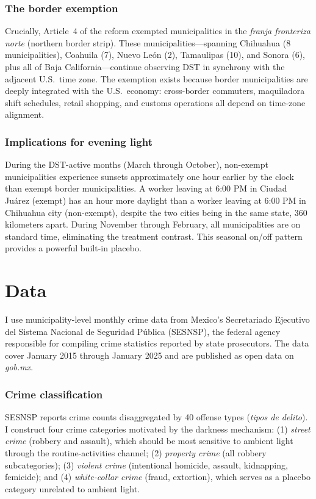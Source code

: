 \documentclass[12pt]{article}
\begin{document}
\subsubsection*{The border exemption} Crucially, Article~4 of the reform exempted municipalities in the \textit{franja fronteriza norte} (northern border strip). These municipalities---spanning Chihuahua (8 municipalities), Coahuila (7), Nuevo Le\'on (2), Tamaulipas (10), and Sonora (6), plus all of Baja California---continue observing DST in synchrony with the adjacent U.S.\ time zone. The exemption exists because border municipalities are deeply integrated with the U.S.\ economy: cross-border commuters, maquiladora shift schedules, retail shopping, and customs operations all depend on time-zone alignment.

\subsubsection*{Implications for evening light} During the DST-active months (March through October), non-exempt municipalities experience sunsets approximately one hour earlier by the clock than exempt border municipalities. A worker leaving at 6:00 PM in Ciudad Ju\'arez (exempt) has an hour more daylight than a worker leaving at 6:00 PM in Chihuahua city (non-exempt), despite the two cities being in the same state, 360 kilometers apart. During November through February, all municipalities are on standard time, eliminating the treatment contrast. This seasonal on/off pattern provides a powerful built-in placebo.

\section{Data}

I use municipality-level monthly crime data from Mexico's Secretariado Ejecutivo del Sistema Nacional de Seguridad P\'ublica (SESNSP), the federal agency responsible for compiling crime statistics reported by state prosecutors. The data cover January 2015 through January 2025 and are published as open data on \textit{gob.mx}.

\subsubsection*{Crime classification} SESNSP reports crime counts disaggregated by 40 offense types (\textit{tipos de delito}). I construct four crime categories motivated by the darkness mechanism: (1) \textit{street crime} (robbery and assault), which should be most sensitive to ambient light through the routine-activities channel; (2) \textit{property crime} (all robbery subcategories); (3) \textit{violent crime} (intentional homicide, assault, kidnapping, femicide); and (4) \textit{white-collar crime} (fraud, extortion), which serves as a placebo category unrelated to ambient light.
\end{document}
